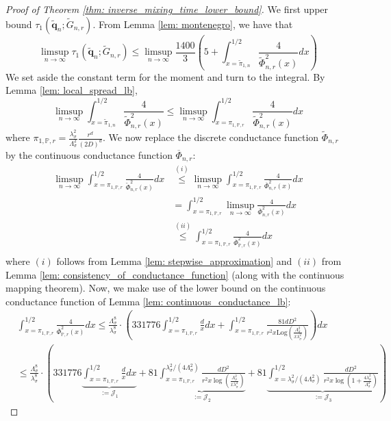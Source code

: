 \documentclass{article}
\newcommand{\1}{\mathbf{1}}
\newcommand{\Log}{\mathrm{Log}}
\newcommand{\qbf}{\mathbf{q}}
\newcommand{\Pbb}{\mathbb{P}}
\theoremstyle{aldenthm}
\begin{document}
\begin{proof}[Proof of Theorem \ref{thm: inverse_mixing_time_lower_bound}]
	We first upper bound $\tau_{1}(\widetilde{\qbf}_n; \widetilde{G}_{n,r})$.  From Lemma \ref{lem: montenegro}, we have that
	\begin{equation*}
	\limsup_{n \to \infty} \tau_{1}(\widetilde{\qbf}_n; \widetilde{G}_{n,r}) \leq \limsup_{n \to \infty} \frac{1400}{3}\left(5 + \int_{x = \widetilde{\pi}_{1,n}}^{1/2} \frac{4}{\widetilde{\Phi}_{n,r}^2(x)} dx\right)
	\end{equation*}
	We set aside the constant term for the moment and turn to the integral. By Lemma \ref{lem: local_spread_lb},
	\begin{equation*}
	\limsup_{n \to \infty}\int_{x = \widetilde{\pi}_{1,n}}^{1/2} \frac{4}{\widetilde{\Phi}_{n,r}^2(x)} \leq \limsup_{n \to \infty}\int_{x = \pi_{1,\Pbb,r}}^{1/2} \frac{4}{\widetilde{\Phi}_{n,r}^2(x)} dx
	\end{equation*}
	where $\pi_{1,\Pbb,r} = \frac{\lambda_{\sigma}^2}{\Lambda_{\sigma}^2} \frac{r^d}{(2D)^d}$. We now replace the discrete conductance function $\widetilde{\Phi}_{n,r}$ by the continuous conductance function $\overline{\Phi}_{n,r}$:
	\begin{align*}
	\limsup_{n \to \infty}\int_{x = \pi_{1,\Pbb,r}}^{1/2} \frac{4}{\widetilde{\Phi}_{n,r}^2(x)} dx & \overset{(i)}{\leq} \limsup_{n \to \infty}\int_{x = \pi_{1,\Pbb,r}}^{1/2} \frac{4}{\overline{\Phi}_{n,r}^2(x)} dx \\
	& = \int_{x = \pi_{1,\Pbb,r}}^{1/2} \limsup_{n \to \infty} \frac{4}{\overline{\Phi}_{n,r}^2(x)} dx \\
	& \overset{(ii)}{\leq} \int_{x = \pi_{1,\Pbb,r}}^{1/2} \frac{4}{\overline{\Phi}_{\Pbb,r}^2(x)} dx \\
	\end{align*}
	where $(i)$ follows from Lemma \ref{lem: stepwise_approximation} and $(ii)$ from Lemma \ref{lem: consistency_of_conductance_function} (along with the continuous mapping theorem). Now, we make use of the lower bound on the continuous conductance function of Lemma \ref{lem: continuous_conductance_lb}:
	\begin{align*}
	& \int_{x = \pi_{1,\Pbb,r}}^{1/2} \frac{4}{\overline{\Phi}_{\Pbb,r}^2(x)} dx \leq \frac{\Lambda_{\sigma}^8}{\lambda_{\sigma}^8} \cdot \left( 331776
	\int_{x = \pi_{1,\Pbb,r}}^{1/2} \frac{d}{x} dx + \int_{x = \pi_{1,\Pbb,r}}^{1/2} \frac{81dD^2}{r^2x \Log(\frac{\Lambda_{\sigma}^2}{x\lambda_{\sigma}^2})}  \right) dx \\
	& \leq \frac{\Lambda_{\sigma}^8}{\lambda_{\sigma}^8} \cdot \left( 331776
	\underbrace{\int_{x = \pi_{1,\Pbb,r}}^{1/2} \frac{d}{x} dx}_{:= \mathcal{J}_1} + 
	81\underbrace{\int_{x = \pi_{1,\Pbb,r}}^{\lambda_{\sigma}^2/(4 \Lambda_{\sigma}^2)} \frac{dD^2}{r^2x \log(\frac{\Lambda_{\sigma}^2}{x\lambda_{\sigma}^2})}}_{:= \mathcal{J}_2} +
	81\underbrace{\int_{x = \lambda_{\sigma}^2/(4 \Lambda_{\sigma}^2)}^{1/2} \frac{dD^2}{r^2x \log(1 + \frac{4 \lambda_{\sigma}^2}{\Lambda_{\sigma}^2})}}_{:= \mathcal{J}_3}  \right)
	\end{align*}
\end{proof}
\end{document}
